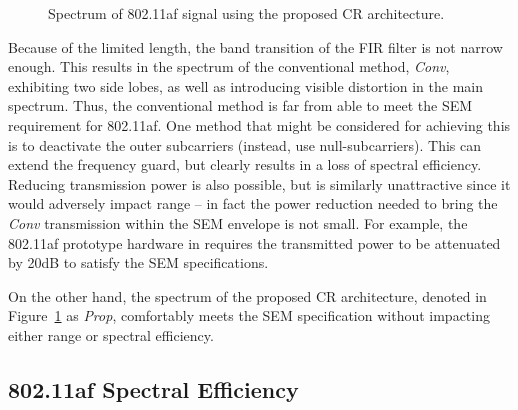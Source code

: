 \begin{figure}
	\centering
	\vspace{-2mm}
\caption{Spectrum of 802.11af signal using the proposed CR architecture.}
\label{fig:80211af}
\end{figure}
%
Because of the limited length, the band transition of the FIR filter is not narrow enough.
This results in the spectrum of the conventional method, \emph{Conv}, exhibiting two side lobes, as well as introducing visible distortion in the main spectrum.
Thus, the conventional method is far from able to meet the SEM requirement for 802.11af.
One method that might be considered for achieving this is to deactivate the outer subcarriers (instead, use null-subcarriers).
This can extend the frequency guard, but clearly results in a loss of spectral efficiency.
Reducing transmission power is also possible, but is similarly unattractive since it would adversely impact range -- in fact the power reduction needed to bring the \emph{Conv} transmission within the SEM envelope is not small.
For example, the 802.11af prototype hardware in \cite{Lan2013} requires the transmitted power to be attenuated by 20dB to satisfy the SEM specifications.

On the other hand, the spectrum of the proposed CR architecture, denoted in Figure~\ref{fig:80211af} as \emph{Prop}, comfortably meets the SEM specification without impacting either range or spectral efficiency.

\subsection{802.11af Spectral Efficiency}

